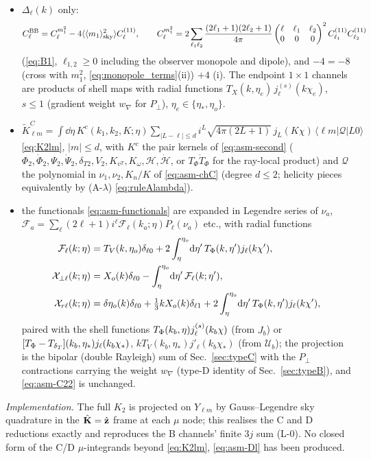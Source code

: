 \begin{itemize}
\item[B$\times$B:] $\Delta_\ell(k)$ only:
\begin{equation}
C^{\rm BB}_\ell=C^{m_1^2}_\ell-4\langle\langle m_1\rangle_{\rm sky}^2\rangle C^{(11)}_\ell,\qquad
C^{m_1^2}_\ell=2\sum_{\ell_1\ell_2}\frac{(2\ell_1+1)(2\ell_2+1)}{4\pi}\begin{pmatrix}\ell&\ell_1&\ell_2\\0&0&0\end{pmatrix}^2C^{(11)}_{\ell_1}C^{(11)}_{\ell_2}
\label{eq:asm-CBB}
\end{equation}
(\eqref{eq:B1}, $\ell_{1,2}\ge0$ including the observer monopole and dipole), and $-4=-8$ (cross with $m_1^2$, \eqref{eq:monopole_terms}(ii)) $+4$ (i).
The endpoint $1\times1$ channels are products of shell maps with radial functions $T_X(k,\eta_e)\,j^{(s)}_\ell(k\chi_e)$, $s\le1$
(gradient weight $w_\nabla$ for $P_\perp$), $\eta_e\in\{\eta_*,\eta_o\}$.
\item[C:] $\tilde K^C_{\ell m}=\int\dd\eta\,K^c(k_1,k_2,K;\eta)\sum_{|L-\ell|\le d}i^L\sqrt{4\pi(2L+1)}\,j_L(K\chi)\,\langle\ell m|\mathcal Q|L0\rangle$ \eqref{eq:K2lm},
$|m|\le d$, with $K^c$ the pair kernels of \eqref{eq:asm-second} ($\Phi_2,\dot\Phi_2,\Psi_2,\dot\Psi_2,\delta_{T2},V_2,K_{v^T},K_\omega,\mathcal H,\dot{\mathcal H}$,
or $T_\Phi\dot T_\Phi$ for the ray-local product) and $\mathcal Q$ the polynomial in $\nu_1,\nu_2,K_n/K$ of \eqref{eq:asm-chC} (degree $d\le2$;
helicity pieces equivalently by (A-$\lambda$) \eqref{eq:ruleAlambda}).
\item[D:] the functionals \eqref{eq:asm-functionals} are expanded in Legendre series of $\nu_a$,
$\mathcal F_a=\sum_\ell(2\ell+1)i^\ell\mathcal F_\ell(k_a;\eta)P_\ell(\nu_a)$ etc., with radial functions
\begin{align}
\mathcal F_\ell(k;\eta)&=T_V(k,\eta_o)\delta_{\ell0}+2\int_\eta^{\eta_o}\!\mathrm d\eta'\,T_\Phi(k,\eta')j_\ell(k\chi'),\nonumber\\
\mathcal X_{\perp\ell}(k;\eta)&=X_o(k)\delta_{\ell0}-\int_\eta^{\eta_o}\!\mathrm d\eta'\,\mathcal F_\ell(k;\eta'),\nonumber\\
\mathcal X_{r\ell}(k;\eta)&=\delta\eta_o(k)\delta_{\ell0}+\tfrac13kX_o(k)\delta_{\ell1}+2\int_\eta^{\eta_o}\!\mathrm d\eta'\,T_\Phi(k,\eta')j_\ell(k\chi'),
\label{eq:asm-Dl}
\end{align}
paired with the shell functions $T_\Phi(k_b,\eta)j^{(s)}_\ell(k_b\chi)$ (from $J_b$) or $[T_\Phi-T_{\delta_T}](k_b,\eta_*)j_\ell(k_b\chi_*)$,
$kT_V(k_b,\eta_*)j'_\ell(k_b\chi_*)$ (from $\mathcal U_b$); the projection is the bipolar (double Rayleigh) sum of Sec.~\ref{sec:typeC} with the
$P_\perp$ contractions carrying the weight $w_\nabla$ (type-D identity of Sec.~\ref{sec:typeB}), and \eqref{eq:asm-C22} is unchanged.
\end{itemize}
\emph{Implementation.}  The full $K_2$ is projected on $Y_{\ell m}$ by Gauss--Legendre sky quadrature in the $\hat{\mathbf K}=\hat{\mathbf z}$ frame at
each $\mu$ node; this realises the C and D reductions exactly and reproduces the B channels' finite $3j$ sum (L-0).  No closed form of the C/D $\mu$-integrands beyond
\eqref{eq:K2lm}, \eqref{eq:asm-Dl} has been produced.

